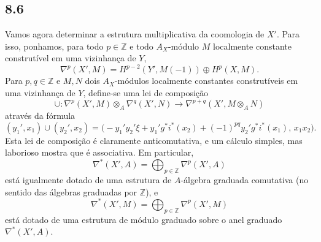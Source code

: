 \subsection*{8.6}

Vamos agora determinar a estrutura multiplicativa da coomologia de $X'$. Para isso, ponhamos, para todo $p\in\mathbb Z$ e todo $A_X$-módulo $M$ localmente constante construtível em uma vizinhança de $Y$,
\[
\nabla^p(X',M)=H^{p-2}(Y',M(-1))\oplus H^p(X,M).
\]
Para $p,q\in\mathbb Z$ e $M,N$ dois $A_X$-módulos localmente constantes construtíveis em uma vizinhança de $Y$, define-se uma lei de composição
\[
\cup:\nabla^p(X',M)\otimes_A\nabla^q(X',N)\to
\nabla^{p+q}(X',M\otimes_A N)
\tag{8.6.1}
\]
através da fórmula
\[
(y_1',x_1)\cup(y_2',x_2)=
\bigl(-y_1'y_2'\xi+y_1'g^*i^*(x_2)+(-1)^{pq}y_2'g^*i^*(x_1),\,x_1x_2\bigr).
\tag{8.6.2}
\]
Esta lei de composição é claramente anticomutativa, e um cálculo simples, mas laborioso mostra que é associativa. Em particular,
\[
\nabla^*(X',A)=\bigoplus_{p\in\mathbb Z}\nabla^p(X',A)
\]
está igualmente dotado de uma estrutura de $A$-álgebra graduada comutativa (no sentido das álgebras graduadas por $\mathbb Z$), e
\[
\nabla^*(X',M)=\bigoplus_{p\in\mathbb Z}\nabla^p(X',M)
\]
está dotado de uma estrutura de módulo graduado sobre o anel graduado $\nabla^*(X',A)$.
